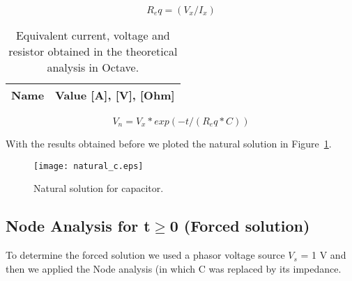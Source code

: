 \begin{equation}[H]
R_eq = (V_x / I_x)
\end{equation}

\begin{table}[H]
  \centering
  \begin{tabular}{|l|r|}
    \hline    
    {\bf Name} & {\bf Value [A], [V], [Ohm]} \\ \hline
	
  \end{tabular}
  \caption{Equivalent current, voltage and resistor obtained in the theoretical analysis in Octave.}
  \label{tab:octave_tab2}
\end{table}
\begin{equation}[H]
V_n = V_x * exp( -t / (R_eq * C))
\end{equation}

With the results obtained before we ploted the natural solution in Figure~\ref{fig:natural}.

\begin{figure}[H] \centering
		\texttt{[image: natural\_c.eps]}
		\caption{Natural solution for capacitor.}
	\label{fig:natural}
\end{figure}


\subsection{Node Analysis for t$\geq$0 (Forced solution)}

\tab To determine the forced solution we used a phasor voltage source $V_s$ = 1 V and then we applied the Node analysis (in which C was replaced by its impedance.

